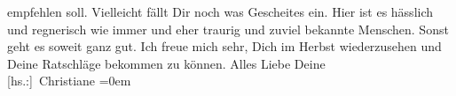 \begin{ledgroupsized}[t]{13cm}
                    empfehlen soll. Vielleicht fällt Dir noch was Gescheites ein.\pend
           \pstart
           Hier ist es hässlich und regnerisch wie immer und eher traurig und zuviel
                    bekannte Menschen.\pend
           \pstart
           Sonst geht es soweit ganz gut.\pend
           \pstart
           Ich freue mich sehr, Dich im Herbst wiederzusehen und Deine
                    Ratschläge bekommen zu können.\pend
           \pstart
           Alles Liebe Deine{\\[\baselineskip]}\spacefill\mbox{{[}hs.:{]} Christiane}\pend
           \leftskip=0em{}\endnumbering{}\end{ledgroupsized}  \newcommand{\dateiname}{L02519}\newcommand{\titel}{Christiane von Hofmannsthal an Arthur Schnitzler, 13. 8. 1929}\newcommand{\editorInnen}{Martin Anton Müller und Gerd-Hermann Susen}
      